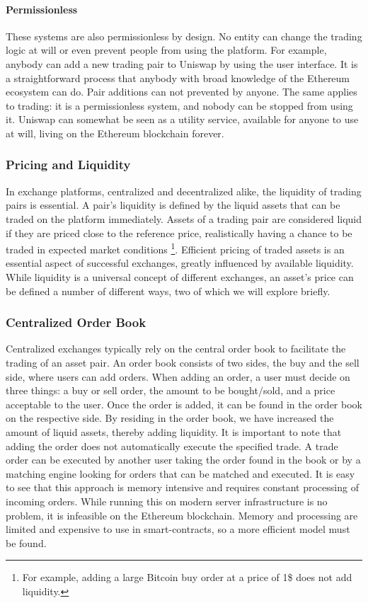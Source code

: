 \documentclass[../../thesis.tex]{subfiles}
\begin{document}
\paragraph{Permissionless}
These systems are also permissionless by design. No entity can change the trading logic at will or even prevent people from using the platform. For example, anybody can add a new trading pair to Uniswap by using the user interface. It is a straightforward process that anybody with broad knowledge of the Ethereum ecosystem can do. Pair additions can not prevented by anyone. The same applies to trading: it is a permissionless system, and nobody can be stopped from using it. Uniswap can somewhat be seen as a utility service, available for anyone to use at will, living on the Ethereum blockchain forever.

\subsubsection{Pricing and Liquidity}
In exchange platforms, centralized and decentralized alike, the liquidity of trading pairs is essential. A pair's liquidity is defined by the liquid assets that can be traded on the platform immediately. Assets of a trading pair are considered liquid if they are priced close to the reference price, realistically having a chance to be traded in expected market conditions \footnote{For example, adding a large Bitcoin buy order at a price of 1\$ does not add liquidity.}. Efficient pricing of traded assets is an essential aspect of successful exchanges, greatly influenced by available liquidity. While liquidity is a universal concept of different exchanges, an asset's price can be defined a number of different ways, two of which we will explore briefly. 

\subsubsection{Centralized Order Book}
Centralized exchanges typically rely on the central order book to facilitate the trading of an asset pair. An order book consists of two sides, the buy and the sell side, where users can add orders. When adding an order, a user must decide on three things: a buy or sell order, the amount to be bought/sold, and a price acceptable to the user. Once the order is added, it can be found in the order book on the respective side. By residing in the order book, we have increased the amount of liquid assets, thereby adding liquidity. It is important to note that adding the order does not automatically execute the specified trade. A trade order can be executed by another user taking the order found in the book or by a matching engine looking for orders that can be matched and executed. It is easy to see that this approach is memory intensive and requires constant processing of incoming orders. While running this on modern server infrastructure is no problem, it is infeasible on the Ethereum blockchain. Memory and processing are limited and expensive to use in smart-contracts, so a more efficient model must be found.
\end{document}
